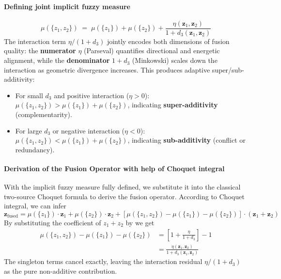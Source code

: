 \documentclass[preprint,12pt]{elsarticle}
\begin{document}
\paragraph{Defining joint implicit fuzzy measure }
\begin{equation*}
    \mu(\{z_1, z_2\}) \;=\; \mu(\{z_1\}) + \mu(\{z_2\}) + \frac{\eta(\mathbf{z}_1, \mathbf{z}_2)}{1 + d_3(\mathbf{z}_1, \mathbf{z}_2)}
\end{equation*}
The interaction term $\eta/(1{+}d_3)$ jointly encodes both dimensions of fusion quality: the \textbf{numerator} $\eta$ (Parseval) quantifies directional and energetic alignment, while the \textbf{denominator} $1+d_3$ (Minkowski) scales down the interaction as geometric divergence increases. This produces adaptive super/sub-additivity:
\begin{itemize}
    \item For small $d_3$ and positive interaction ($\eta > 0$): $\mu(\{z_1, z_2\}) > \mu(\{z_1\}) + \mu(\{z_2\})$, indicating \textbf{super-additivity} (complementarity).
    \item For large $d_3$ or negative interaction ($\eta < 0$): $\mu(\{z_1, z_2\}) < \mu(\{z_1\}) + \mu(\{z_2\})$, indicating \textbf{sub-additivity} (conflict or redundancy).
\end{itemize}

\paragraph{Derivation of the Fusion Operator with help of Choquet integral}
With the implicit fuzzy measure fully defined, we substitute it into the classical two-source Choquet formula to derive the fusion operator. According to Choquet integral, we can infer
\begin{equation*}
\mathbf{z}_{\text{fused}} = \mu(\{z_1\}) \cdot \mathbf{z}_1 + \mu(\{z_2\}) \cdot \mathbf{z}_2 + [ \mu(\{z_1, z_2\}) - \mu(\{z_1\}) - \mu(\{z_2\}) ] \cdot (\mathbf{z}_1 + \mathbf{z}_2)
\end{equation*}
 By substituting the coefficient of $z_1+z_2$ by we get
\begin{equation*}
\begin{aligned}
    \mu(\{z_1, z_2\}) - \mu(\{z_1\}) - \mu(\{z_2\}) &= \left[ 1 + \frac{\eta}{1+d_3} \right] - 1 \\
    &= \frac{\eta(\mathbf{z}_1, \mathbf{z}_2)}{1 + d_3(\mathbf{z}_1, \mathbf{z}_2)}
\end{aligned}
\end{equation*}
The singleton terms cancel exactly, leaving the interaction residual $\eta/(1+d_3)$ as the pure non-additive contribution.
\end{document}
